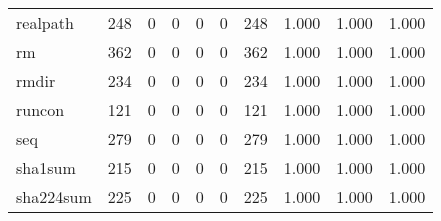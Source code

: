 \begin{longtable}{lp{2.0cm}p{2.0cm}p{2.0cm}p{2.0cm}p{2.0cm}p{2.0cm}p{2.0cm}p{2.0cm}p{2.0cm}}
realpath  &                    248 &                                  0 &                                 0 &                                0 &                                 0 &                             248 &                                   1.000 &                                  1.000 &                                1.000 \\
rm        &                    362 &                                  0 &                                 0 &                                0 &                                 0 &                             362 &                                   1.000 &                                  1.000 &                                1.000 \\
rmdir     &                    234 &                                  0 &                                 0 &                                0 &                                 0 &                             234 &                                   1.000 &                                  1.000 &                                1.000 \\
runcon    &                    121 &                                  0 &                                 0 &                                0 &                                 0 &                             121 &                                   1.000 &                                  1.000 &                                1.000 \\
seq       &                    279 &                                  0 &                                 0 &                                0 &                                 0 &                             279 &                                   1.000 &                                  1.000 &                                1.000 \\
sha1sum   &                    215 &                                  0 &                                 0 &                                0 &                                 0 &                             215 &                                   1.000 &                                  1.000 &                                1.000 \\
sha224sum &                    225 &                                  0 &                                 0 &                                0 &                                 0 &                             225 &                                   1.000 &                                  1.000 &                                1.000 \\

\end{longtable}
